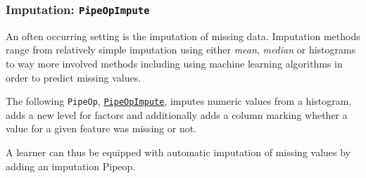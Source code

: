 \documentclass[]{article}
\newenvironment{Shaded}{\begin{snugshade}}{\end{snugshade}}
\newcommand{\DataTypeTok}[1]{\textcolor[rgb]{0.13,0.29,0.53}{#1}}
\newcommand{\KeywordTok}[1]{\textcolor[rgb]{0.13,0.29,0.53}{\textbf{#1}}}
\newcommand{\NormalTok}[1]{#1}
\newcommand{\OperatorTok}[1]{\textcolor[rgb]{0.81,0.36,0.00}{\textbf{#1}}}
\newcommand{\StringTok}[1]{\textcolor[rgb]{0.31,0.60,0.02}{#1}}
\renewenvironment{Shaded} {\begin{snugshade}\small} {\end{snugshade}}
\begin{document}
\hypertarget{imputation-pipeopimpute}{%
\subsubsection{\texorpdfstring{Imputation: \texttt{PipeOpImpute}}{Imputation: PipeOpImpute}}\label{imputation-pipeopimpute}}

An often occurring setting is the imputation of missing data.
Imputation methods range from relatively simple imputation using either \emph{mean}, \emph{median} or histograms to way more involved methods including using machine learning algorithms in order to predict missing values.

The following \texttt{PipeOp}, \href{https://mlr3pipelines.mlr-org.com/reference/PipeOpImpute.html}{\texttt{PipeOpImpute}}, imputes numeric values from a histogram, adds a new level for factors and additionally adds a column marking whether a value for a given feature was missing or not.

\begin{Shaded}
\end{Shaded}

A learner can thus be equipped with automatic imputation of missing values by adding an imputation Pipeop.

\begin{Shaded}
\end{Shaded}
\end{document}
